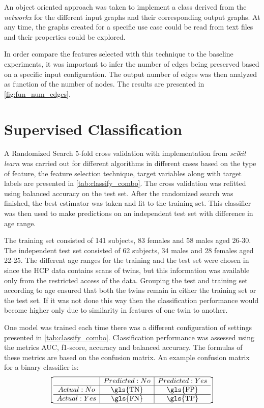 \documentclass[msthesis.tex]{subfiles}
\begin{document}
An object oriented approach was taken to implement a class derived from the \textit{networkx} \citep{hagberg2008exploring} for the different input graphs and their corresponding output graphs. At any time, the graphs created for a specific use case could be read from text files and their properties could be explored.

In order compare the features selected with this technique to the baseline experiments, it was important to infer the number of edges being preserved based on a specific input configuration. The output number of edges was then analyzed as function of the number of nodes. The results are presented in \cref{fig:fun_num_edges}.

\section{Supervised Classification}

A Randomized Search 5-fold cross validation with implementation from \textit{scikit learn} was carried out for different algorithms in different cases based on the type of feature, the feature selection technique, target variables along with target labels are presented in \autoref{tab:classify_combo}. The cross validation was refitted using balanced accuracy on the test set. After the randomized search was finished, the best estimator was taken and fit to the training set. This classifier was then used to make predictions on an independent test set with difference in age range.

The training set consisted of 141 subjects, 83 females and 58 males aged 26-30. The independent test set consisted of 62 subjects, 34 males and 28 females aged 22-25. The different age ranges for the training and the test set were chosen in since the \gls{HCP} data contains scans of twins, but this information was available only from the restricted access of the data. Grouping the test and training set according to age ensured that both the twins remain in either the training set or the test set. If it was not done this way then the classification performance would become higher only due to similarity in features of one twin to another.

One model was trained each time there was a different configuration of settings presented in \autoref{tab:classify_combo}. Classification performance was assessed using the metrics \gls{AUC}, f1-score, accuracy and balanced accuracy.
\iffalse
The formulas of these metrics are based on the confusion matrix. An example confusion matrix for a binary classifier is:\\
\begin{equation}
\begin{bmatrix}
\begin{array}{c|c|c}
\hline
    & Predicted: No & Predicted: Yes \\
\hline
Actual: No & \textrm{\gls{TN}} & \textrm{\gls{FP}}\\
\hline
Actual: Yes & \textrm{\gls{FN}} & \textrm{\gls{TP}} \\
\hline
\end{array}
\end{bmatrix}
\end{equation}
\end{document}
